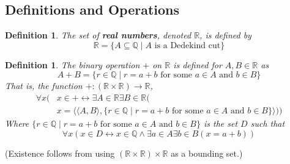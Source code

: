 \documentclass{report}
\newtheorem{definition}[theo]{Definition}
\begin{document}
\subsection{Definitions and Operations}
\begin{definition}
The set of \textbf{real numbers}, denoted $\mathbb R$, is defined by
\begin{equation*}
\mathbb R=\{A\subseteq\mathbb Q\mid A\text{ is a Dedekind cut}\}
\end{equation*}
\end{definition}
\begin{definition}
The binary operation $+$ on $\mathbb R$ is defined for $A,B\in\mathbb R$ as
\begin{equation*}
A+B=\{r\in\mathbb Q\mid r=a+b\text{ for some $a\in A$ and $b\in B$}\}
\end{equation*}
That is, the function $+:(\mathbb R\times\mathbb R)\to\mathbb R$,
\begin{align*}
\forall x(&x\in+\leftrightarrow\exists A\in\mathbb R\exists B\in\mathbb R(\\
&x=\langle\langle A,B\rangle,\{r\in\mathbb Q\mid r=a+b\text{ for some $a\in A$ and $b\in B$}\}\rangle))
\end{align*}
Where $\{r\in\mathbb Q\mid r=a+b\text{ for some $a\in A$ and $b\in B$}\}$ is the set $D$ such that
\begin{equation*}
\forall x(x\in D\leftrightarrow x\in\mathbb Q\land\exists a\in A\exists b\in B(x=a+b))
\end{equation*}
\end{definition}
\noindent(Existence follows from using $(\mathbb R\times\mathbb R)\times\mathbb R$ as a bounding set.)
\end{document}
